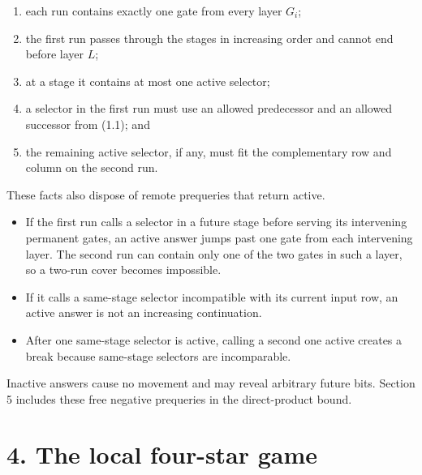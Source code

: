 \documentclass[11pt,a4paper]{article}
\begin{document}
\begin{enumerate}

\item each run contains exactly one gate from every layer \(G_i\);

\item the first run passes through the stages in increasing order and cannot end before layer \(L\);

\item at a stage it contains at most one active selector;

\item a selector in the first run must use an allowed predecessor and an allowed successor from (1.1); and

\item the remaining active selector, if any, must fit the complementary row and column on the second run.

\end{enumerate}

These facts also dispose of remote prequeries that return active.


\begin{itemize}

\item If the first run calls a selector in a future stage before serving its intervening permanent gates, an active answer jumps past one gate from each intervening layer.  The second run can contain only one of the two gates in such a layer, so a two-run cover becomes impossible.

\item If it calls a same-stage selector incompatible with its current input row, an active answer is not an increasing continuation.

\item After one same-stage selector is active, calling a second one active creates a break because same-stage selectors are incomparable.

\end{itemize}

Inactive answers cause no movement and may reveal arbitrary future bits. Section 5 includes these free negative prequeries in the direct-product bound.


\section*{4. The local four-star game}
\end{document}
